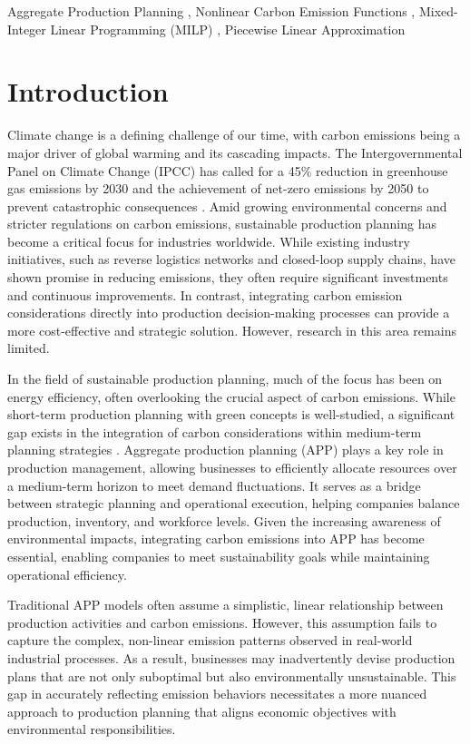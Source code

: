 \documentclass[final,3p,times,review,authoryear]{elsarticle}
\begin{document}
\begin{frontmatter}
\begin{keyword}
 Aggregate Production Planning  \sep
Nonlinear Carbon Emission Functions  \sep
Mixed-Integer Linear Programming (MILP)  \sep
Piecewise Linear Approximation
\end{keyword}
\end{frontmatter}




\section{Introduction}

Climate change is a defining challenge of our time, with carbon emissions being a major driver of global warming and its cascading impacts. The Intergovernmental Panel on Climate Change (IPCC) has called for a 45\% reduction in greenhouse gas emissions by 2030 and the achievement of net-zero emissions by 2050 to prevent catastrophic consequences \citep{IPCC2018}. Amid growing environmental concerns and stricter regulations on carbon emissions, sustainable production planning has become a critical focus for industries worldwide. While existing industry initiatives, such as reverse logistics networks and closed-loop supply chains, have shown promise in reducing emissions, they often require significant investments and continuous improvements. In contrast, integrating carbon emission considerations directly into production decision-making processes can provide a more cost-effective and strategic solution. However, research in this area remains limited.

In the field of sustainable production planning, much of the focus has been on energy efficiency, often overlooking the crucial aspect of carbon emissions. While short-term production planning with green concepts is well-studied, a significant gap exists in the integration of carbon considerations within medium-term planning strategies \citep{Qasim2023}. Aggregate production planning (APP) plays a key role in production management, allowing businesses to efficiently allocate resources over a medium-term horizon to meet demand fluctuations. It serves as a bridge between strategic planning and operational execution, helping companies balance production, inventory, and workforce levels. Given the increasing awareness of environmental impacts, integrating carbon emissions into APP has become essential, enabling companies to meet sustainability goals while maintaining operational efficiency.

Traditional APP models often assume a simplistic, linear relationship between production activities and carbon emissions\citep{10.1080/00207543.2015.1005761, 10.1016/j.ijpe.2013.06.005}. However, this assumption fails to capture the complex, non-linear emission patterns observed in real-world industrial processes\citep{10.1287/mnsc.2020.3724}. As a result, businesses may inadvertently devise production plans that are not only suboptimal but also environmentally unsustainable. This gap in accurately reflecting emission behaviors necessitates a more nuanced approach to production planning that aligns economic objectives with environmental responsibilities.
\end{document}

